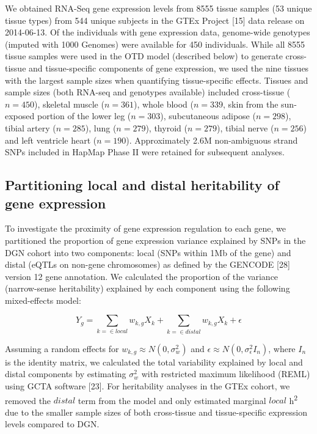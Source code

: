 \documentclass[]{article}
\begin{document}
We obtained RNA-Seq gene expression levels from 8555 tissue samples (53
unique tissue types) from 544 unique subjects in the GTEx Project
{[}15{]} data release on 2014-06-13. Of the individuals with gene
expression data, genome-wide genotypes (imputed with 1000 Genomes) were
available for 450 individuals. While all 8555 tissue samples were used
in the OTD model (described below) to generate cross-tissue and
tissue-specific components of gene expression, we used the nine tissues
with the largest sample sizes when quantifying tissue-specific effects.
Tissues and sample sizes (both RNA-seq and genotypes available) included
cross-tissue (\(n=450\)), skeletal muscle (\(n=361\)), whole blood
(\(n=339\), skin from the sun-exposed portion of the lower leg
(\(n=303\)), subcutaneous adipose (\(n=298\)), tibial artery
(\(n=285\)), lung (\(n=279\)), thyroid (\(n=279\)), tibial nerve
(\(n=256\)) and left ventricle heart (\(n=190\)). Approximately 2.6M
non-ambiguous strand SNPs included in HapMap Phase II were retained for
subsequent analyses.

\subsection{Partitioning local and distal heritability of gene
expression}\label{partitioning-local-and-distal-heritability-of-gene-expression}

To investigate the proximity of gene expression regulation to each gene,
we partitioned the proportion of gene expression variance explained by
SNPs in the DGN cohort into two components: local (SNPs within 1Mb of
the gene) and distal (eQTLs on non-gene chromosomes) as defined by the
GENCODE {[}28{]} version 12 gene annotation. We calculated the
proportion of the variance (narrow-sense heritability) explained by each
component using the following mixed-effects model:

\[ Y_g = \sum_{k = \in local}w_{k,g} X_k + \sum_{k = \in distal}w_{k,g} X_k + \epsilon \]

Assuming a random effects for \(w_{k,g} \approx N(0, \sigma^2_w)\) and
\(\epsilon \approx N(0, \sigma^2_{\epsilon} I_n)\), where \(I_n\) is the
identity matrix, we calculated the total variability explained by local
and distal components by estimating \(\sigma^2_w\) with restricted
maximum likelihood (REML) using GCTA software {[}23{]}. For heritability
analyses in the GTEx cohort, we removed the \(distal\) term from the
model and only estimated marginal \(local\) h\textsuperscript{2} due to
the smaller sample sizes of both cross-tissue and tissue-specific
expression levels compared to DGN.
\end{document}
